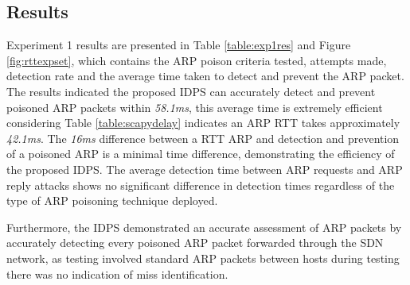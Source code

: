 \documentclass[12pt, oneside]{book}
\begin{document}
\subsection{Results}
Experiment 1 results are presented in Table \ref{table:exp1res} and Figure \ref{fig:rttexpset}, which contains the ARP poison criteria tested,
attempts made, detection rate and the average time taken to detect and prevent the ARP packet. The results
indicated the proposed IDPS can accurately detect and prevent poisoned ARP packets within \emph{58.1ms}, this average
time is extremely efficient considering Table \ref{table:scapydelay} indicates an ARP RTT takes approximately \emph{42.1ms}.
The \emph{16ms} difference between a RTT ARP and detection and prevention of a poisoned ARP is a minimal time difference,
demonstrating the efficiency of the proposed IDPS.
The average detection time between ARP requests and ARP reply attacks shows no significant difference
 in detection times regardless of the type of ARP poisoning technique deployed.

Furthermore, the IDPS demonstrated an accurate assessment of ARP packets by accurately detecting every poisoned ARP packet
forwarded through the SDN network, as testing involved standard ARP packets between hosts during testing there was no 
indication of miss identification.
\end{document}
